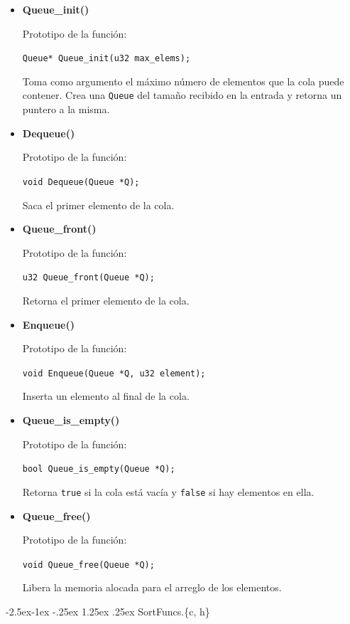 \documentclass[11pt,a4paper]{article}
\makeatletter
\renewcommand\paragraph{\@startsection{paragraph}{4}{\z@}%
            {-2.5ex\@plus -1ex \@minus -.25ex}%
            {1.25ex \@plus .25ex}%
            {\normalfont\normalsize\bfseries}}
\theoremstyle{plain}
\makeatother
\begin{document}
\begin{itemize}
\item{\textbf{{Queue\_init()}}}

Prototipo de la función:

\texttt{Queue* Queue\_init(u32 max\_elems);}

Toma como argumento el máximo número de elementos que la cola puede contener. Crea una \texttt{Queue} del tamaño recibido en la entrada y retorna un puntero a la misma.

\item{\textbf{{Dequeue()}}}

Prototipo de la función:

\texttt{void Dequeue(Queue *Q);}

Saca el primer elemento de la cola.

\item{\textbf{{Queue\_front()}}}

Prototipo de la función:

\texttt{u32 Queue\_front(Queue *Q);}

Retorna el primer elemento de la cola.

\item{\textbf{{Enqueue()}}}

Prototipo de la función:

\texttt{void Enqueue(Queue *Q, u32 element);}

Inserta un elemento al final de la cola.

\item{\textbf{{Queue\_is\_empty()}}}

Prototipo de la función:

\texttt{bool Queue\_is\_empty(Queue *Q);}

Retorna \texttt{true} si la cola está vacía y \texttt{false} si hay elementos en ella.

\item{\textbf{{Queue\_free()}}}

Prototipo de la función:

\texttt{void Queue\_free(Queue *Q);}

Libera la memoria alocada para el arreglo de los elementos.

\end{itemize}

				\paragraph{SortFuncs.\{c, h\}}
\end{document}
